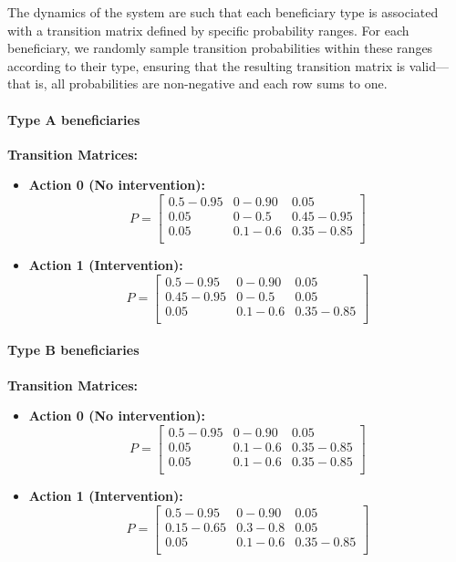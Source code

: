\documentclass{article} %
\begin{document}
{The dynamics of the system are such that each beneficiary type is associated with a transition matrix defined by specific probability ranges. For each beneficiary, we randomly sample transition probabilities within these ranges according to their type, ensuring that the resulting transition matrix is valid—that is, all probabilities are non-negative and each row sums to one.


\paragraph{Type A beneficiaries}
\textbf{Transition Matrices:}
\begin{itemize}
    \item \textbf{Action 0 (No intervention):}
    \[
    P = \begin{bmatrix}
    0.5-0.95 & 0-0.90 & 0.05 \\
    0.05 & 0-0.5 & 0.45-0.95 \\
    0.05 & 0.1-0.6 & 0.35-0.85\\
    \end{bmatrix}
    \]
    \item \textbf{Action 1 (Intervention):}
    \[
    P = \begin{bmatrix}
    0.5-0.95 & 0-0.90 & 0.05 \\
    0.45-0.95 & 0-0.5 & 0.05 \\
    0.05 & 0.1-0.6 & 0.35-0.85\\
    \end{bmatrix}
    \]
\end{itemize}


\paragraph{Type B beneficiaries}
\textbf{Transition Matrices:}
\begin{itemize}
    \item \textbf{Action 0 (No intervention):}
    \[
    P = \begin{bmatrix}
    0.5-0.95 & 0-0.90 & 0.05 \\
    0.05 & 0.1-0.6 & 0.35-0.85 \\
    0.05 & 0.1-0.6 & 0.35-0.85\\
    \end{bmatrix}
    \]
    \item \textbf{Action 1 (Intervention):}
    \[
    P = \begin{bmatrix}
    0.5-0.95 & 0-0.90 & 0.05 \\
    0.15-0.65 & 0.3-0.8 & 0.05 \\
    0.05 & 0.1-0.6 & 0.35-0.85\\
    \end{bmatrix}
    \]
\end{itemize}

}
\end{document}
